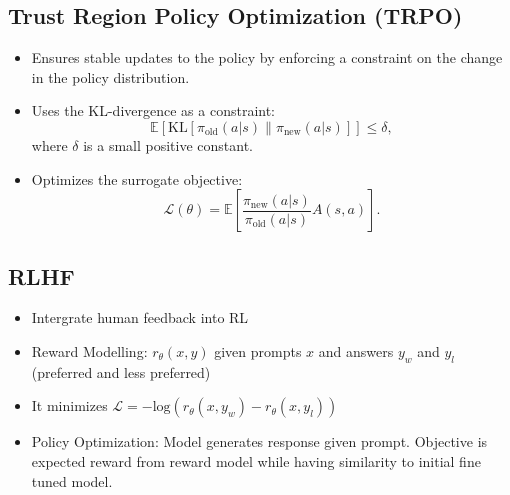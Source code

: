 \documentclass[12pt,a4paper]{article}
\begin{document}
\subsection{Trust Region Policy Optimization (TRPO)}
\begin{itemize}
    \item Ensures stable updates to the policy by enforcing a constraint on the change in the policy distribution.
    \item Uses the KL-divergence as a constraint:
    \[ \mathbb{E}[\text{KL}[\pi_\text{old}(a|s) \| \pi_\text{new}(a|s)]] \leq \delta, \]
    where $\delta$ is a small positive constant.
    \item Optimizes the surrogate objective:
    \[ \mathcal{L}(\theta) = \mathbb{E}\left[\frac{\pi_\text{new}(a|s)}{\pi_\text{old}(a|s)} A(s, a)\right]. \]
\end{itemize}
\subsection{RLHF}
\begin{itemize}
    \item Intergrate human feedback into RL 
    \item Reward Modelling: $r_{\theta}(x,y)$ given prompts $x$ and answers $y_w$ and $y_l$ (preferred and less preferred) 
    \item It minimizes $\mathcal{L}= -\text{log}(r_{\theta}(x,y_w)-r_{\theta}(x,y_l))$
    \item Policy Optimization: Model generates response given prompt. Objective is expected reward from reward model while having similarity to initial fine tuned model.
\end{itemize}
\pagebreak
\end{document}
